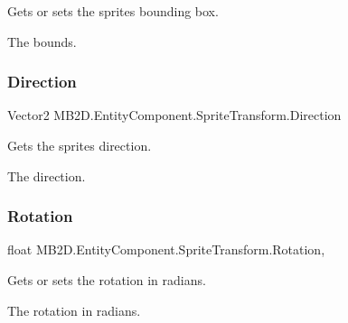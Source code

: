 Gets or sets the sprites bounding box. 

The bounds.\hypertarget{class_m_b2_d_1_1_entity_component_1_1_sprite_transform_a0cd51eee71ba1b1f548e0950c05a8e12}{}\label{class_m_b2_d_1_1_entity_component_1_1_sprite_transform_a0cd51eee71ba1b1f548e0950c05a8e12} 
\subsubsection{\texorpdfstring{Direction}{Direction}}
{\footnotesize\ttfamily Vector2 M\+B2\+D.\+Entity\+Component.\+Sprite\+Transform.\+Direction\hspace{0.3cm}{\ttfamily [get]}}



Gets the sprites direction. 

The direction.\hypertarget{class_m_b2_d_1_1_entity_component_1_1_sprite_transform_a6220a2c6ca43613d77065ec9eddc99dd}{}\label{class_m_b2_d_1_1_entity_component_1_1_sprite_transform_a6220a2c6ca43613d77065ec9eddc99dd} 
\subsubsection{\texorpdfstring{Rotation}{Rotation}}
{\footnotesize\ttfamily float M\+B2\+D.\+Entity\+Component.\+Sprite\+Transform.\+Rotation\hspace{0.3cm}{\ttfamily [get]}, {\ttfamily [set]}}



Gets or sets the rotation in radians. 

The rotation in radians.\hypertarget{class_m_b2_d_1_1_entity_component_1_1_sprite_transform_a31edaa3c4ce6d37d74b639032be4f845}{}\label{class_m_b2_d_1_1_entity_component_1_1_sprite_transform_a31edaa3c4ce6d37d74b639032be4f845} 
